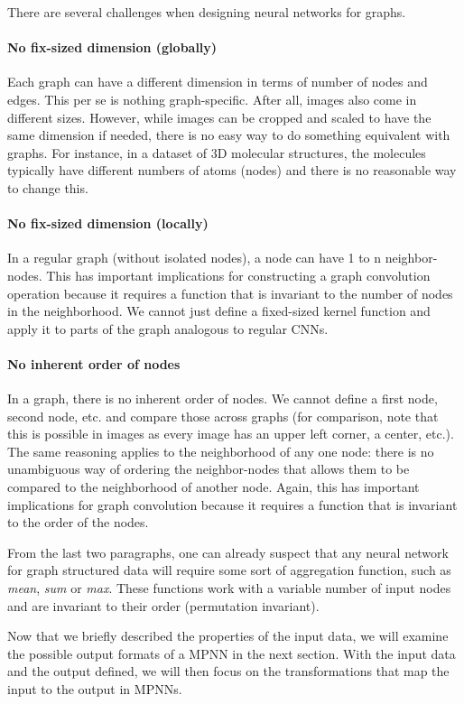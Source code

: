 There are several challenges when designing neural networks for graphs.

\paragraph{No fix-sized dimension (globally)}
Each graph can have a different dimension in terms of number of nodes and edges. This per se is nothing graph-specific. After all, images also come in different sizes. However, while images can be cropped and scaled to have the same dimension if needed, there is no easy way to do something equivalent with graphs. For instance, in a dataset of 3D molecular structures, the molecules typically have different numbers of atoms (nodes) and there is no reasonable way to change this.
\paragraph{No fix-sized dimension (locally)}
In a regular graph (without isolated nodes), a node can have 1 to n neighbor-nodes. This has important implications for constructing a graph convolution operation because it requires a function that is invariant to the number of nodes in the neighborhood. We cannot just define a fixed-sized kernel function and apply it to parts of the graph analogous to regular CNNs.
\paragraph{No inherent order of nodes}
In a graph, there is no inherent order of nodes. We cannot define a first node, second node, etc. and compare those across graphs (for comparison, note that this is possible in images as every image has an upper left corner, a center, etc.). The same reasoning applies to the neighborhood of any one node: there is no unambiguous way of ordering the neighbor-nodes that allows them to be compared to the neighborhood of another node. Again, this has important implications for graph convolution because it requires a function that is invariant to the order of the nodes.

From the last two paragraphs, one can already suspect that any neural network for graph structured data will require some sort of aggregation function, such as \textit{mean}, \textit{sum} or  \textit{max}. These functions work with a variable number of input nodes and are invariant to their order (permutation invariant).

Now that we briefly described the properties of the input data, we will examine the possible output formats of a MPNN in the next section. With the input data and the output defined, we will then focus on the transformations that map the input to the output in MPNNs.

